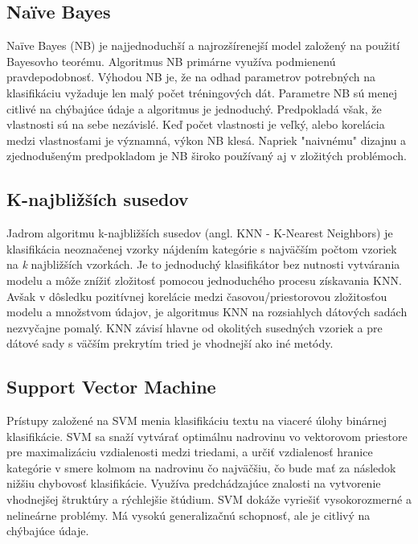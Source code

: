 \subsection*{Naïve Bayes}
Naïve Bayes (NB) je najjednoduchší a najrozšírenejší model založený na použití Bayesovho teorému. Algoritmus NB primárne využíva podmienenú pravdepodobnosť. Výhodou NB je, že na odhad parametrov potrebných na klasifikáciu vyžaduje len malý počet tréningových dát. Parametre NB sú menej citlivé na chýbajúce údaje a algoritmus je jednoduchý. Predpokladá však, že vlastnosti sú na sebe nezávislé. Keď počet vlastnosti je veľký, alebo korelácia medzi vlastnosťami je významná, výkon NB klesá. Napriek "naivnému" dizajnu a zjednodušeným predpokladom je NB široko používaný aj v zložitých problémoch.

\subsection*{K-najbližších susedov}
Jadrom algoritmu k-najbližších susedov (angl. KNN - K-Nearest Neighbors) je klasifikácia neoznačenej vzorky nájdením kategórie s najväčším počtom vzoriek na \textit{k} najbližších vzorkách. Je to jednoduchý klasifikátor bez nutnosti vytvárania modelu a môže znížiť zložitosť pomocou jednoduchého procesu získavania KNN. Avšak v dôsledku pozitívnej korelácie medzi časovou/priestorovou zložitosťou modelu a množstvom údajov, je algoritmus KNN na rozsiahlych dátových sadách nezvyčajne pomalý. KNN závisí hlavne od okolitých susedných vzoriek a pre dátové sady s väčším prekrytím tried  je vhodnejší ako iné metódy.

\subsection*{Support Vector Machine}
Prístupy založené na SVM menia klasifikáciu textu na viaceré úlohy binárnej klasifikácie. SVM sa snaží vytvárať optimálnu nadrovinu vo vektorovom priestore pre maximalizáciu vzdialenosti medzi triedami, a určiť vzdialenosť hranice kategórie v smere kolmom na nadrovinu čo najväčšiu, čo bude mať za následok nižšiu chybovosť klasifikácie. Využíva predchádzajúce znalosti na vytvorenie vhodnejšej štruktúry a rýchlejšie štúdium. SVM dokáže vyriešiť vysokorozmerné a nelineárne problémy. Má vysokú generalizačnú schopnosť, ale je citlivý na chýbajúce údaje.


